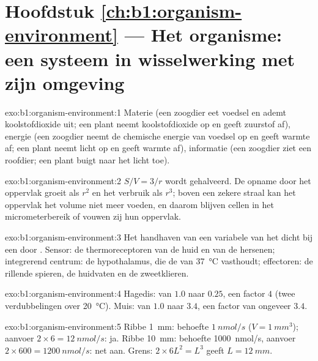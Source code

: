 \section*{Hoofdstuk \ref{ch:b1:organism-environment} --- Het organisme: een systeem in wisselwerking met zijn omgeving}

\begin{solution}{exo:b1:organism-environment:1}
Materie (een zoogdier eet voedsel en ademt koolstofdioxide uit; een plant
neemt koolstofdioxide op en geeft zuurstof af), energie (een zoogdier neemt de
chemische energie van voedsel op en geeft warmte af; een plant neemt licht op
en geeft warmte af), informatie (een zoogdier ziet een roofdier; een plant
buigt naar het licht toe).
\end{solution}

\begin{solution}{exo:b1:organism-environment:2}
$S/V = 3/r$ wordt gehalveerd. De opname door het oppervlak groeit als $r^2$ en
het verbruik als $r^3$; boven een zekere straal kan het oppervlak het volume
niet meer voeden, en daarom blijven cellen in het micrometerbereik of vouwen
zij hun oppervlak.
\end{solution}

\begin{solution}{exo:b1:organism-environment:3}
Het handhaven van een variabele van het  dicht bij een
 door . Sensor: de thermoreceptoren van de
huid en van de hersenen; integrerend centrum: de hypothalamus, die de
 van \qty{37}{\celsius} vasthoudt; effectoren: de rillende spieren,
de huidvaten en de zweetklieren.
\end{solution}

\begin{solution}{exo:b1:organism-environment:4}
Hagedis: van $1.0$ naar $0.25$, een factor $4$ (twee verdubbelingen over
\qty{20}{\celsius}). Muis: van $1.0$ naar $3.4$, een factor van ongeveer
$3.4$.
\end{solution}

\begin{solution}{exo:b1:organism-environment:5}
Ribbe \qty{1}{mm}: behoefte $\qty{1}{nmol/s}$ ($V = \qty{1}{mm^3}$); aanvoer
$2\times 6 = \qty{12}{nmol/s}$: ja. Ribbe \qty{10}{mm}: behoefte
\qty{1000}{nmol/s}, aanvoer $2\times 600 = \qty{1200}{nmol/s}$: net aan.
Grens: $2\times 6L^2 = L^3$ geeft $L = \qty{12}{mm}$.
\end{solution}


